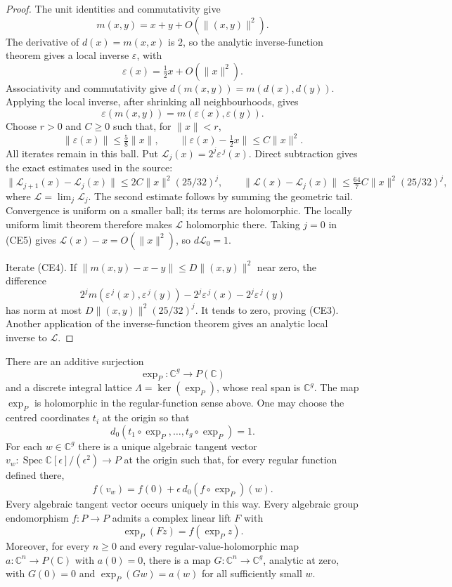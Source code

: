 \begin{proof}
The unit identities and commutativity give
\[
          m(x,y)=x+y+O(\|(x,y)\|^2).
\]
The derivative of \(d(x)=m(x,x)\) is \(2\), so the analytic
inverse-function theorem gives a local inverse \(\varepsilon\), with
\[
       \varepsilon(x)=\tfrac12x+O(\|x\|^2).
\]
Associativity and commutativity give
\(d(m(x,y))=m(d(x),d(y))\).  Applying the local inverse, after shrinking
all neighbourhoods, gives
\[
       \varepsilon(m(x,y))=m(\varepsilon(x),\varepsilon(y)).   \tag{CE4}
\]
Choose \(r>0\) and \(C\geq0\) such that, for \(\|x\|<r\),
\[
 \|\varepsilon(x)\|\leq\tfrac58\|x\|,\qquad
 \|\varepsilon(x)-\tfrac12x\|\leq C\|x\|^2.
\]
All iterates remain in this ball.  Put
\(\mathcal L_j(x)=2^j\varepsilon^{\,j}(x)\).  Direct subtraction gives
the exact estimates used in the source:
\[
 \|\mathcal L_{j+1}(x)-\mathcal L_j(x)\|
       \leq2C\|x\|^2(25/32)^j,\qquad
 \|\mathcal L(x)-\mathcal L_j(x)\|
       \leq\tfrac{64}{7}C\|x\|^2(25/32)^j,                  \tag{CE5}
\]
where \(\mathcal L=\lim_j\mathcal L_j\).
The second estimate follows by summing the geometric tail.
Convergence is uniform on a smaller ball; its terms are holomorphic.
The locally uniform limit theorem therefore makes \(\mathcal L\)
holomorphic there.  Taking \(j=0\) in (CE5) gives
\(\mathcal L(x)-x=O(\|x\|^2)\), so \(d\mathcal L_0=1\).

Iterate (CE4).  If
\(\|m(x,y)-x-y\|\leq D\|(x,y)\|^2\) near zero, the difference
\[
 2^j m(\varepsilon^{\,j}(x),\varepsilon^{\,j}(y))
 -2^j\varepsilon^{\,j}(x)-2^j\varepsilon^{\,j}(y)
\]
has norm at most
\(D\|(x,y)\|^2(25/32)^j\).  It tends to zero, proving (CE3).
Another application of the inverse-function theorem gives an analytic
local inverse to \(\mathcal L\).
\end{proof}

\begin{srproposition}
\label{prop:ftb-actual-complex-exponential}
There are an additive surjection
\[
                 \exp_P:\mathbb C^g\longrightarrow P(\mathbb C)
\]
and a discrete integral lattice
\(\Lambda=\ker(\exp_P)\), whose real span is \(\mathbb C^g\).
The map \(\exp_P\) is holomorphic in the regular-function sense above.
One may choose the centred coordinates \(t_i\) at the origin so that
\[
             d_0(t_1\circ\exp_P,\ldots,t_g\circ\exp_P)=1.    \tag{CE6}
\]
For each \(w\in\mathbb C^g\) there is a unique algebraic tangent vector
\(v_w:\operatorname{Spec}\mathbb C[\epsilon]/(\epsilon^2)\to P\)
at the origin such that, for every regular function defined there,
\[
          f(v_w)=f(0)+\epsilon\,d_0(f\circ\exp_P)(w).         \tag{CE7}
\]
Every algebraic tangent vector occurs uniquely in this way.
Every algebraic group endomorphism \(f:P\to P\) admits a complex
linear lift \(F\) with
\[
                         \exp_P(Fz)=f(\exp_P z).            \tag{CE8}
\]
Moreover, for every \(n\geq0\) and every regular-value-holomorphic
map \(a:\mathbb C^n\to P(\mathbb C)\) with \(a(0)=0\), there is a
map \(G:\mathbb C^n\to\mathbb C^g\), analytic at zero, with
\(G(0)=0\) and \(\exp_P(Gw)=a(w)\) for all sufficiently small \(w\).
\end{srproposition}

